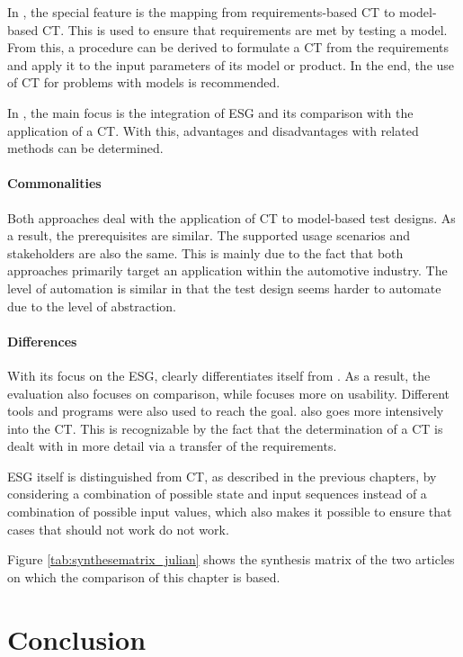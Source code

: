 In \cite{Conrad}, the special feature is the mapping from requirements-based CT to model-based CT. This is used to ensure that requirements are met by testing a model. From this, a procedure can be derived to formulate a CT from the requirements and apply it to the input parameters of its model or product. In the end, the use of CT for problems with models is recommended. 

In \cite{Belli}, the main focus is the integration of ESG and its comparison with the application of a CT. With this, advantages and disadvantages with related methods can be determined.

\paragraph{Commonalities}

Both approaches deal with the application of CT to model-based test designs. As a result, the prerequisites are similar. The supported usage scenarios and stakeholders are also the same. This is mainly due to the fact that both approaches primarily target an application within the automotive industry. The level of automation is similar in that the test design seems harder to automate due to the level of abstraction.

\paragraph{Differences}

With its focus on the ESG, \cite{Belli} clearly differentiates itself from \cite{Conrad}. As a result, the evaluation also focuses on comparison, while \cite{Conrad} focuses more on usability. Different tools and programs were also used to reach the goal. \cite{Conrad} also goes more intensively into the CT. This is recognizable by the fact that the determination of a CT is dealt with in more detail via a transfer of the requirements.

ESG itself is distinguished from CT, as described in the previous chapters, by considering a combination of possible state and input sequences instead of a combination of possible input values, which also makes it possible to ensure that cases that should not work do not work.

Figure \ref{tab:synthesematrix_julian} shows the synthesis matrix of the two articles on which the comparison of this chapter is based. 

\section{Conclusion}
\label{Kap:Conclusion}

